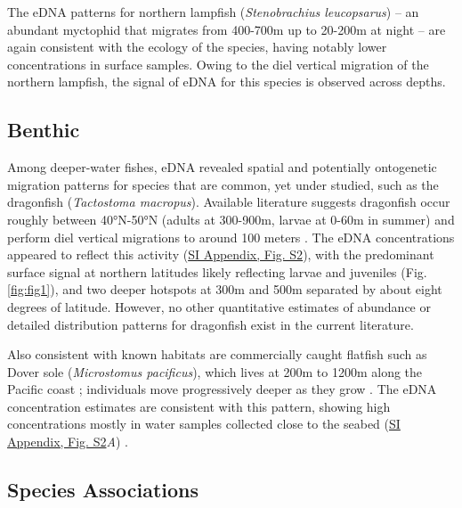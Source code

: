 \documentclass{article}
\begin{document}
The eDNA patterns for northern lampfish (\textit{Stenobrachius leucopsarus}) -- an abundant myctophid that migrates from 400-700m up to 20-200m at night \cite{moku2000,suntsov2008} -- are again consistent with the ecology of the species, having notably lower concentrations in surface samples. Owing to the diel vertical migration of the northern lampfish, the signal of eDNA for this species is observed across depths.

\subsection*{Benthic}
Among deeper-water fishes, eDNA revealed spatial and potentially ontogenetic migration patterns for species that are common, yet under studied, such as the dragonfish (\textit{Tactostoma macropus}). Available literature suggests dragonfish occur roughly between 40°N-50°N (adults at 300-900m, larvae at 0-60m in summer) \cite{kawaguchi1993} and perform diel vertical migrations to around 100 meters \cite{kawaguchi1993,willis1982}. The eDNA concentrations appeared to reflect this activity (\href{SI_Appendix.pdf}{SI Appendix, Fig. S2}), with the predominant surface signal at northern latitudes likely reflecting larvae and juveniles (Fig. \ref{fig:fig1}), and two deeper hotspots at 300m and 500m separated by about eight degrees of latitude. However, no other quantitative estimates of abundance or detailed distribution patterns for dragonfish exist in the current literature.

Also consistent with known habitats are commercially caught flatfish such as Dover sole (\textit{Microstomus pacificus}), which lives at 200m to 1200m along the Pacific coast \cite{drazen2007,brodziak2000,drazen2012}; individuals move progressively deeper as they grow \cite{vetter1994,hunter1990}. The eDNA concentration estimates are consistent with this pattern, showing high concentrations mostly in water samples collected close to the seabed (\href{SI_Appendix.pdf}{SI Appendix, Fig. S2}\textit{A}) \cite{ono2016}.

\subsection*{Species Associations}
\end{document}
